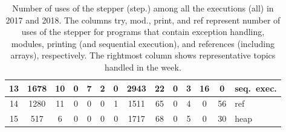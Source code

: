 \begin{table}[!b]
\begin{center}
\begin{tabular}{|c||c|c|c|c|c|c||c|c|c|c|c|c||l|}
    13 & 1678 & 10 & 0 & 7 & 2 & 0 & 2943 & 22 & 0 & 3 & 16 & 0 & seq.\ exec.\\ \hline
    14 & 1280 & 11 & 0 & 0 & 0 & 1 & 1511 & 65 & 0 & 4 & 0 & 56 & ref\\ \hline
    15 & 517 & 6 & 0 & 0 & 0 & 0 & 1717 & 68 & 0 & 5 & 0 & 30 & heap\\ \hline
  \end{tabular}
\end{center}
  \caption{Number of uses of the stepper (step.) among all the
  executions (all) in 2017 and 2018.  The columns try, mod., print,
  and ref represent number of uses of the stepper for programs that
  contain exception handling, modules, printing (and sequential
  execution), and references (including arrays), respectively.
  The rightmost column shows representative topics handled in the
  week.}
  \label{TableUsage}
\end{table}

